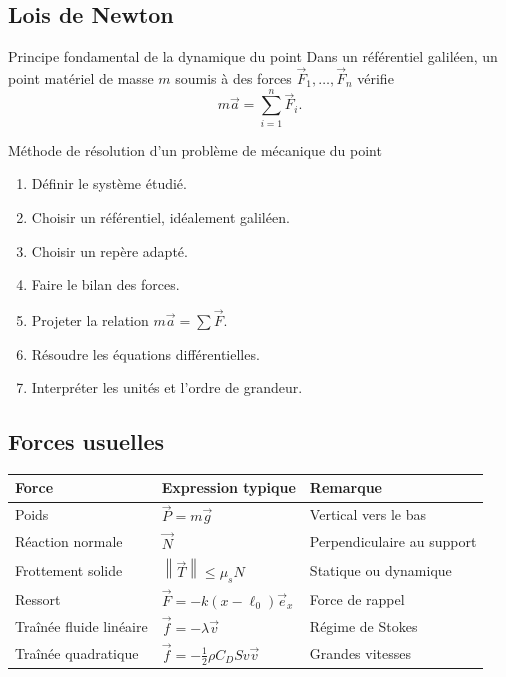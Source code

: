 \documentclass[11pt,a4paper]{article}
\newcommand{\norm}[1]{\left\lVert #1 \right\rVert}
\begin{document}
\subsection{Lois de Newton}

\begin{theoremBox}{Principe fondamental de la dynamique du point}{}
Dans un référentiel galiléen, un point matériel de masse $m$ soumis à des forces $\vec F_1,\dots,\vec F_n$ vérifie
\[
m\vec a=\sum_{i=1}^{n}\vec F_i.
\]
\end{theoremBox}

\begin{methodbox}{Méthode de résolution d'un problème de mécanique du point}{}
\begin{enumerate}
  \item Définir le système étudié.
  \item Choisir un référentiel, idéalement galiléen.
  \item Choisir un repère adapté.
  \item Faire le bilan des forces.
  \item Projeter la relation $m\vec a=\sum\vec F$.
  \item Résoudre les équations différentielles.
  \item Interpréter les unités et l'ordre de grandeur.
\end{enumerate}
\end{methodbox}

\subsection{Forces usuelles}

\begin{center}
\begin{tabular}{lll}
\toprule
Force & Expression typique & Remarque \\
\midrule
Poids & $\vec P=m\vec g$ & Vertical vers le bas \\
Réaction normale & $\vec N$ & Perpendiculaire au support \\
Frottement solide & $\norm{\vec T}\leq \mu_s N$ & Statique ou dynamique \\
Ressort & $\vec F=-k(x-\ell_0)\vec e_x$ & Force de rappel \\
Traînée fluide linéaire & $\vec f=-\lambda \vec v$ & Régime de Stokes \\
Traînée quadratique & $\vec f=-\frac12\rho C_D S v\vec v$ & Grandes vitesses \\
\bottomrule
\end{tabular}
\end{center}
\end{document}
